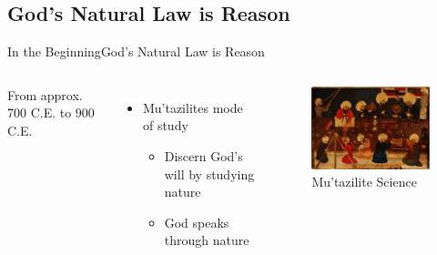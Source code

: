 \subsection{God's Natural Law is Reason}
\begin{frame}{In the Beginning}{God's Natural Law is Reason}
	\begin{columns}[T]
			From approx. 700 C.E. to 900 C.E.\\
			\begin{itemize}
				\item Mu'tazilites mode of study
					\begin{itemize}
						\item Discern God's will by studying nature
						\item God speaks through nature
					\end{itemize}
			\end{itemize}
			\begin{figure}
				\centering
				\includegraphics[width=\textwidth]{images/mutazilite_science}
				\caption{Mu'tazilite Science}
			\end{figure}
	\end{columns}
\end{frame}

